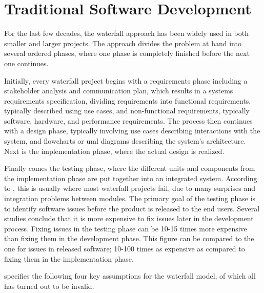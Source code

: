 \documentclass[a4paper,english,12pt]{report}
\begin{document}
\section{Traditional Software Development}\label{sec:traditional-software-development}
For the last few decades, the waterfall approach has been widely used in both smaller and larger projects. The approach divides the problem at hand into several ordered phases, where one phase is completely finished before the next one continues. \citep[p. 16]{stober2009agile}

Initially, every waterfall project begins with a requirements phase including a stakeholder analysis and communication plan, which results in a systems requirements specification, dividing requirements into functional requirements, typically described using use cases, and non-functional requirements, typically software, hardware, and performance requirements. The process then continues with a design phase, typically involving use cases describing interactions with the system, and flowcharts or \gls{uml} diagrams describing the system's architecture. Next is the implementation phase, where the actual design is realized. \citep[pp. 17-23]{stober2009agile}

Finally comes the testing phase, where the different units and components from the implementation phase are put together into an integrated system. According to \citet{stober2009agile}, this is usually where most waterfall projects fail, due to many surprises and integration problems between modules. The primary goal of the testing phase is to identify software issues before the product is released to the end users. Several studies conclude that it is more expensive to fix issues later in the development process. Fixing issues in the testing phase can be 10-15 times more expensive than fixing them in the development phase. This figure can be compared to the one for issues in released software; 10-100 times as expensive as compared to fixing them in the implementation phase. \citep[pp. 23-24]{stober2009agile}

\citet[pp. 20-24]{leffingwell2007scaling} specifies the following four key assumptions for the waterfall model, of which all has turned out to be invalid.
\end{document}
